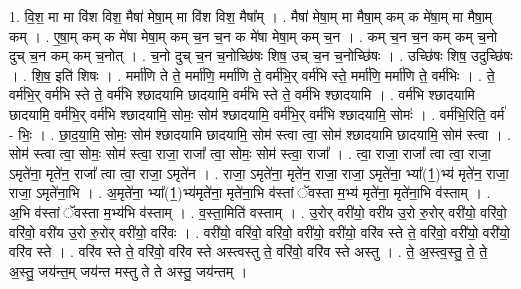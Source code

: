 \documentclass[17pt]{extarticle}
\begin{document}
1. वि॒श॒ मा मा वि॑श विश॒ मैषा॑ मेषा॒म् मा वि॑श विश॒ मैषा᳚म् । . मैषा॑ मेषा॒म् मा मैषा॒म् कम् क मे॑षा॒म् मा मैषा॒म् कम् । . ए॒षा॒म् कम् क मे॑षा मेषा॒म् कम् च॒न च॒न क मे॑षा मेषा॒म् कम् च॒न । . कम् च॒न च॒न कम् कम् च॒नो दुच् च॒न कम् कम् च॒नोत् । . च॒नो दुच् च॒न च॒नोच्छि॑षः शिष॒ उच् च॒न च॒नोच्छि॑षः । . उच्छि॑षः शिष॒ उदुच्छि॑षः । . शि॒ष॒ इति॑ शिषः । . मर्मा॑णि ते ते॒ मर्मा॑णि॒ मर्मा॑णि ते॒ वर्म॑भि॒र् वर्म॑भि स्ते॒ मर्मा॑णि॒ मर्मा॑णि ते॒ वर्म॑भिः । . ते॒ वर्म॑भि॒र् वर्म॑भि स्ते ते॒ वर्म॑भि श्छादयामि छादयामि॒ वर्म॑भि स्ते ते॒ वर्म॑भि श्छादयामि । . वर्म॑भि श्छादयामि छादयामि॒ वर्म॑भि॒र् वर्म॑भि श्छादयामि॒ सोमः॒ सोम॑ श्छादयामि॒ वर्म॑भि॒र् वर्म॑भि श्छादयामि॒ सोमः॑ । . वर्म॑भि॒रिति॒ वर्म॑ - भिः॒ । . छा॒द॒या॒मि॒ सोमः॒ सोम॑ श्छादयामि छादयामि॒ सोम॑ स्त्वा त्वा॒ सोम॑ श्छादयामि छादयामि॒ सोम॑ स्त्वा । . सोम॑ स्त्वा त्वा॒ सोमः॒ सोम॑ स्त्वा॒ राजा॒ राजा᳚ त्वा॒ सोमः॒ सोम॑ स्त्वा॒ राजा᳚ । . त्वा॒ राजा॒ राजा᳚ त्वा त्वा॒ राजा॒ ऽमृते॑ना॒ मृते॑न॒ राजा᳚ त्वा त्वा॒ राजा॒ ऽमृते॑न । . राजा॒ ऽमृते॑ना॒ मृते॑न॒ राजा॒ राजा॒ ऽमृते॑ना॒ भ्या᳚(1॒)भ्य॑ मृते॑न॒ राजा॒ राजा॒ ऽमृते॑ना॒भि । . अ॒मृते॑ना॒ भ्या᳚(1॒)भ्य॑मृते॑ना॒ मृते॑ना॒भि व॑स्तां ॅवस्ता म॒भ्य॑ मृते॑ना॒ मृते॑ना॒भि व॑स्ताम् । . अ॒भि व॑स्तां ॅवस्ता म॒भ्य॑भि व॑स्ताम् । . व॒स्ता॒मिति॑ वस्ताम् । . उ॒रोर् वरी॑यो॒ वरी॑य उ॒रो रु॒रोर् वरी॑यो॒ वरि॑वो॒ वरि॑वो॒ वरी॑य उ॒रो रु॒रोर् वरी॑यो॒ वरि॑वः । . वरी॑यो॒ वरि॑वो॒ वरि॑वो॒ वरी॑यो॒ वरी॑यो॒ वरि॑व स्ते ते॒ वरि॑वो॒ वरी॑यो॒ वरी॑यो॒ वरि॑व स्ते । . वरि॑व स्ते ते॒ वरि॑वो॒ वरि॑व स्ते अस्त्वस्तु ते॒ वरि॑वो॒ वरि॑व स्ते अस्तु । . ते॒ अ॒स्त्व॒स्तु॒ ते॒ ते॒ अ॒स्तु॒ जय॑न्त॒म् जय॑न्त मस्तु ते ते अस्तु॒ जय॑न्तम् । \newline
\end{document}
